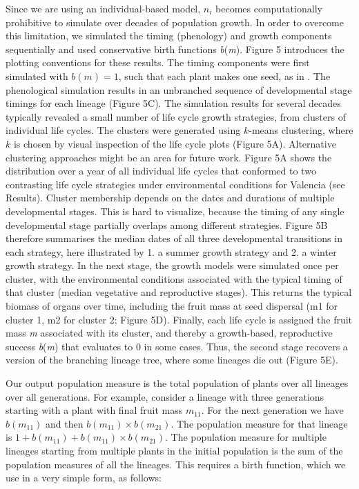 \documentclass[phd]{infthesis}
\begin{document}
Since we are using an individual-based model, \(n_{i}\) becomes computationally
prohibitive to simulate over decades of population growth. In order to overcome
this limitation, we simulated the timing (phenology) and growth components
sequentially and used conservative birth functions \emph{b}(\emph{m}). Figure 5
introduces the plotting conventions for these results. The timing components
were first simulated with \(b(m) = 1\), such that each plant makes one seed, as
in \citet{(Burghardt et al., 2015).}. The phenological simulation results in an
unbranched sequence of developmental stage timings for each lineage (Figure
5C). The simulation results for several decades typically revealed a small
number of life cycle growth strategies, from clusters of individual life
cycles. The clusters were generated using \(k\)-means clustering, where \(k\) is
chosen by visual inspection of the life cycle plots (Figure 5A). Alternative
clustering approaches might be an area for future work. Figure 5A shows the
distribution over a year of all individual life cycles that conformed to two
contrasting life cycle strategies under environmental conditions for Valencia
(see Results).  Cluster membership depends on the dates and durations of
multiple developmental stages. This is hard to visualize, because the timing of
any single developmental stage partially overlaps among different
strategies. Figure 5B therefore summarises the median dates of all three
developmental transitions in each strategy, here illustrated by 1. a summer
growth strategy and 2. a winter growth strategy. In the next stage, the growth
models were simulated once per cluster, with the environmental conditions
associated with the typical timing of that cluster (median vegetative and
reproductive stages). This returns the typical biomass of organs over time,
including the fruit mass at seed dispersal (m1 for cluster 1, m2 for cluster 2;
Figure 5D). Finally, each life cycle is assigned the fruit mass \emph{m}
associated with its cluster, and thereby a growth-based, reproductive success
\emph{b}(\emph{m}) that evaluates to 0 in some cases. Thus, the second stage
recovers a version of the branching lineage tree, where some lineages die out
(Figure 5E).

Our output population measure is the total population of plants over all
lineages over all generations. For example, consider a lineage with
three generations starting with a plant with final fruit mass
\(m_{11}\). For the next generation we have \(b(m_{11})\) and then
\(b(m_{11}) \times b(m_{21})\). The population measure for that lineage
is \(1 + b(m_{11}) + b(m_{11}) \times b(m_{21})\). The population
measure for multiple lineages starting from multiple plants in the
initial population is the sum of the population measures of all the
lineages. This requires a birth function, which we use in a very simple
form, as follows:
\end{document}
